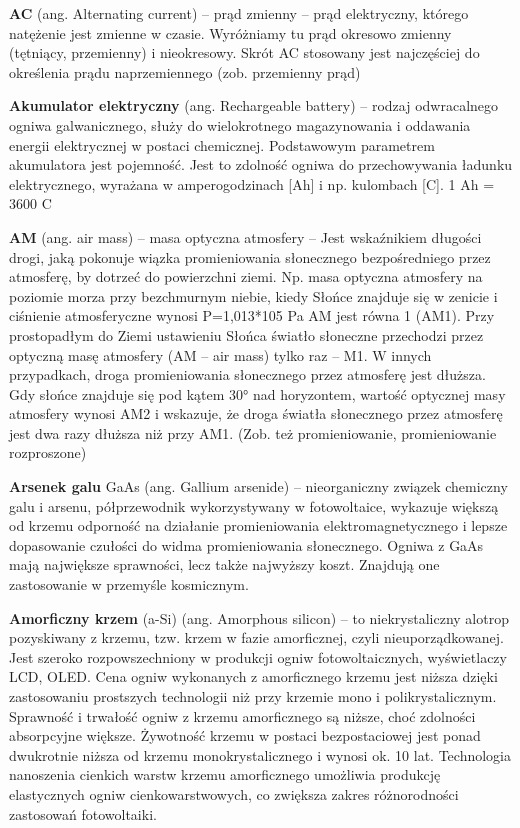 \documentclass[12pt,a4paper]{article}
\begin{document}
\textbf{AC} (ang. Alternating current) – prąd zmienny – prąd elektryczny, którego natężenie jest zmienne w czasie. Wyróżniamy tu prąd okresowo zmienny (tętniący, przemienny) i nieokresowy. Skrót AC stosowany jest najczęściej do określenia prądu naprzemiennego (zob. przemienny prąd)

\textbf{Akumulator elektryczny} (ang. Rechargeable battery) – rodzaj odwracalnego ogniwa galwanicznego, służy do wielokrotnego magazynowania i oddawania energii elektrycznej w postaci chemicznej. Podstawowym parametrem akumulatora jest pojemność. Jest to zdolność ogniwa do przechowywania ładunku elektrycznego, wyrażana w amperogodzinach [Ah] i np. kulombach [C]. 1 Ah = 3600 C

\textbf{AM} (ang. air mass) – masa optyczna atmosfery – Jest wskaźnikiem długości drogi, jaką pokonuje wiązka promieniowania słonecznego bezpośredniego przez atmosferę, by dotrzeć do powierzchni ziemi. Np. masa optyczna atmosfery na poziomie morza przy bezchmurnym niebie, kiedy Słońce znajduje się w zenicie i ciśnienie atmosferyczne wynosi P=1,013*105 Pa AM jest równa 1 (AM1). Przy prostopadłym do Ziemi ustawieniu Słońca światło słoneczne przechodzi przez optyczną masę atmosfery (AM – air mass) tylko raz – M1. W innych przypadkach, droga promieniowania słonecznego przez atmosferę jest dłuższa. Gdy słońce znajduje się pod kątem 30° nad horyzontem, wartość optycznej masy atmosfery wynosi AM2 i wskazuje, że droga światła słonecznego przez atmosferę jest dwa razy dłuższa niż przy AM1. (Zob. też promieniowanie, promieniowanie rozproszone)

\textbf{Arsenek galu} GaAs (ang. Gallium arsenide) – nieorganiczny związek chemiczny galu i arsenu, półprzewodnik wykorzystywany w fotowoltaice, wykazuje większą od krzemu odporność na działanie promieniowania elektromagnetycznego i lepsze dopasowanie czułości do widma promieniowania słonecznego. Ogniwa z GaAs mają największe sprawności, lecz także najwyższy koszt. Znajdują one zastosowanie w przemyśle kosmicznym.

\textbf{Amorficzny krzem} (a-Si) (ang. Amorphous silicon) – to niekrystaliczny alotrop pozyskiwany z krzemu, tzw. krzem w fazie amorficznej, czyli nieuporządkowanej. Jest szeroko rozpowszechniony w produkcji ogniw fotowoltaicznych, wyświetlaczy LCD, OLED. Cena ogniw wykonanych z amorficznego krzemu jest niższa dzięki zastosowaniu prostszych technologii niż przy krzemie mono i polikrystalicznym. Sprawność i trwałość ogniw z krzemu amorficznego są niższe, choć zdolności absorpcyjne większe. Żywotność krzemu w postaci bezpostaciowej jest ponad dwukrotnie niższa od krzemu monokrystalicznego i wynosi ok. 10 lat. Technologia nanoszenia cienkich warstw krzemu amorficznego umożliwia produkcję elastycznych ogniw cienkowarstwowych, co zwiększa zakres różnorodności zastosowań fotowoltaiki.
\end{document}
